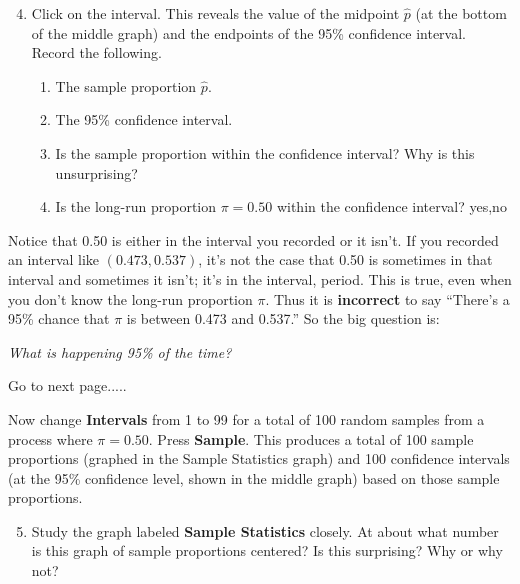 \documentclass{amsart}
\begin{document}
\begin{Form}
\begin{enumerate}
\setcounter{enumi}{3}
\item Click on the interval. This reveals the value of the midpoint $\hat{p}$ (at the bottom of the middle graph) and the endpoints of the 95\% confidence interval. Record the following.

\begin{enumerate}
\item The sample proportion $\hat{p}$. \TextField[name=q4a,width=30pt]{}
\item The 95\% confidence interval. \TextField[name=q4b,width=75pt]{}
\item Is the sample proportion within the confidence interval? Why is this unsurprising?\\
\TextField[name=q4c,width=0.9\textwidth]{}
\item Is the long-run proportion $\pi = 0.50$ within the confidence interval? \ChoiceMenu[combo,name=q4e,width=1.5cm,charsize=14pt]{\mbox{}}
{yes,no} 

\end{enumerate}
\end{enumerate}
\bigskip

\noindent Notice that 0.50 is either in the interval you recorded or it isn't. If you recorded an interval like $(0.473, 0.537)$, it's not the case that 0.50 is sometimes in that interval and sometimes it isn't; it's in the interval, period. This is true, even when you don't know the long-run proportion $\pi$. Thus it is {\bf incorrect} to say ``There's a 95\% chance that $\pi$ is between 0.473 and 0.537.'' So the big question is:
\bigskip

\centerline{ \emph{What is happening 95\% of the time?} }
\bigskip 

Go to next page.....

\newpage
\noindent Now change {\bf Intervals} from 1 to 99 for a total of 100 random samples from a process where $\pi=0.50$. Press {\bf Sample}. This produces a total of 100 sample proportions (graphed in the Sample Statistics graph) and 100 confidence intervals (at the 95\% confidence level, shown in the middle graph) based on those sample proportions. 
\bigskip

\begin{enumerate}
\setcounter{enumi}{4}
\item Study the graph labeled \textbf{Sample Statistics} closely. At about what number is this graph of sample proportions centered? Is this surprising? Why or why not?\\
\TextField[name=q5a,width=0.9\textwidth]{}


\end{enumerate}
\end{Form}
\end{document}
